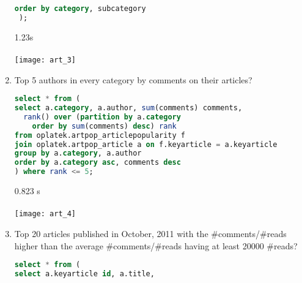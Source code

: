 \begin{enumerate}
\begin{lstlisting}[language=sql]
  order by category, subcategory
 );
\end{lstlisting}
     1.23s\\ \\
      \texttt{[image: art\_3]}
\item    Top 5 authors in every category by comments on their articles?
\begin{lstlisting}[language=sql] 
select * from (
select a.category, a.author, sum(comments) comments, 
  rank() over (partition by a.category 
    order by sum(comments) desc) rank 
from oplatek.artpop_articlepopularity f
join oplatek.artpop_article a on f.keyarticle = a.keyarticle
group by a.category, a.author
order by a.category asc, comments desc
) where rank <= 5;
\end{lstlisting}
     0.823 s\\ \\
      \texttt{[image: art\_4]}
\item    Top 20 articles published in October, 2011 with the \#comments/\#reads higher than the average \#comments/\#reads having at least 20000 \#reads?
\begin{lstlisting}[language=sql] 
select * from (
select a.keyarticle id, a.title,

\end{lstlisting}
\end{enumerate}
